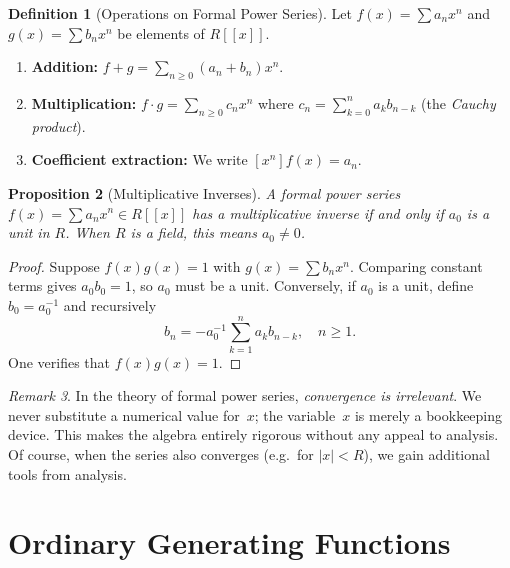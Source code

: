 \documentclass[12pt,a4paper,openany]{book}
\theoremstyle{definition}
\newtheorem{definition}{Definition}[chapter]
\theoremstyle{plain}
\newtheorem{proposition}[definition]{Proposition}
\theoremstyle{remark}
\newtheorem{remark}[definition]{Remark}
\newcommand{\abs}[1]{\left|#1\right|}
\begin{document}
\begin{definition}[Operations on Formal Power Series]\label{def:fps-ops}
Let $f(x) = \sum a_n x^n$ and $g(x) = \sum b_n x^n$ be elements of
$R[[x]]$.
\begin{enumerate}[label=(\roman*)]
  \item \textbf{Addition:}
    $f + g = \sum_{n \ge 0}(a_n + b_n)x^n$.
  \item \textbf{Multiplication:}
    $f \cdot g = \sum_{n \ge 0} c_n x^n$ where
    $c_n = \sum_{k=0}^n a_k b_{n-k}$
    (the \emph{Cauchy product}).
  \item \textbf{Coefficient extraction:} We write $[x^n]f(x) = a_n$.
\end{enumerate}
\end{definition}

\begin{proposition}[Multiplicative Inverses]\label{prop:fps-inverse}
A formal power series $f(x) = \sum a_n x^n \in R[[x]]$ has a
multiplicative inverse if and only if $a_0$ is a unit in $R$.  When
$R$ is a field, this means $a_0 \neq 0$.
\end{proposition}

\begin{proof}
Suppose $f(x)g(x) = 1$ with $g(x) = \sum b_n x^n$.  Comparing
constant terms gives $a_0 b_0 = 1$, so $a_0$ must be a unit.
Conversely, if $a_0$ is a unit, define $b_0 = a_0^{-1}$ and
recursively
\[
  b_n = -a_0^{-1}\sum_{k=1}^{n}a_k b_{n-k}, \quad n \ge 1.
\]
One verifies that $f(x)g(x) = 1$.
\end{proof}

\begin{remark}\label{rem:fps-convergence}
In the theory of formal power series, \emph{convergence is
irrelevant}.  We never substitute a numerical value for~$x$; the
variable~$x$ is merely a bookkeeping device.  This makes the algebra
entirely rigorous without any appeal to analysis.  Of course, when
the series also converges (e.g.\ for $\abs{x} < R$), we gain
additional tools from analysis.
\end{remark}



\section{Ordinary Generating Functions}\label{sec:ogf}
\end{document}
